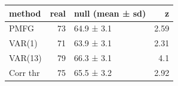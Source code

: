 \begin{tabular}{lrlr}
\toprule
method & real & null (mean ± sd) & z \\
\midrule
PMFG & 73 & 64.9 ± 3.1 & 2.59 \\
VAR(1) & 71 & 63.9 ± 3.1 & 2.31 \\
VAR(13) & 79 & 66.3 ± 3.1 & 4.1 \\
Corr thr & 75 & 65.5 ± 3.2 & 2.92 \\
\bottomrule
\end{tabular}
